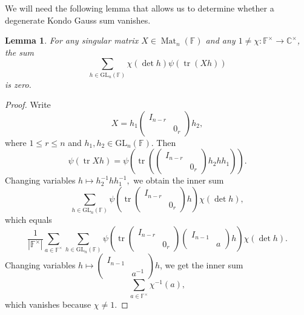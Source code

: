 \documentclass[12pt, reqno]{amsart}
\newtheorem{lemma}[theorem]{Lemma}
\theoremstyle{definition}
\theoremstyle{definition}
\theoremstyle{definition}
\newcommand{\cComplex}{\mathbb{C}}
\newcommand{\multiplicativegroup}[1]{#1^{\times}}
\newcommand{\sizeof}[1]{\left|#1\right|}
\newcommand{\fieldCharacter}{\psi}
\newcommand{\IdentityMatrix}[1]{I_{#1}}
\newcommand{\trace}{\operatorname{tr}}
\newcommand{\GL}{\mathrm{GL}}
\newcommand{\finiteField}{\mathbb{F}}
\newcommand{\squareMatrix}{\operatorname{Mat}}
\begin{document}
We will need the following lemma that allows us to determine whether a degenerate Kondo Gauss sum vanishes.
\begin{lemma}\label{lem:sum-vanishes-for-singular-matrices}
	For any singular matrix $X \in \squareMatrix_n\left(\finiteField\right)$ and any $1 \ne \chi \colon \multiplicativegroup{\finiteField} \to \multiplicativegroup{\cComplex}$, the sum
	$$\sum_{h \in \GL_n\left(\finiteField\right)} \chi\left(\det h\right) \fieldCharacter\left(\trace\left(Xh\right)\right)$$
	is zero.
\end{lemma}
\begin{proof}
	Write $$X = h_1 \begin{pmatrix}
		\IdentityMatrix{n-r}\\
		& 0_r
	\end{pmatrix} h_2,$$
	where $1 \le r \le n$ and $h_1, h_2 \in \GL_n\left(\finiteField\right)$. Then
	$$\fieldCharacter\left(\trace Xh\right) = \fieldCharacter\left(\trace\left( \begin{pmatrix}
		\IdentityMatrix{n-r}\\
		& 0_r
	\end{pmatrix} h_2 h h_1\right)\right).$$
	Changing variables $h \mapsto h_2^{-1} h h_1^{-1},$
	we obtain the inner sum
	$$\sum_{h \in \GL_n\left(\finiteField\right)} \fieldCharacter\left(\trace \begin{pmatrix}
		\IdentityMatrix{n-r}\\
		& 0_r
	\end{pmatrix} h \right) \chi\left(\det h\right),$$
	which equals
	$$\frac{1}{\sizeof{\multiplicativegroup{\finiteField}}} \sum_{a \in \multiplicativegroup{\finiteField}} \sum_{h \in \GL_n\left(\finiteField\right)} \fieldCharacter\left(\trace \begin{pmatrix}
		\IdentityMatrix{n-r}\\
		& 0_r
	\end{pmatrix} \begin{pmatrix}
		\IdentityMatrix{n-1}\\
		& a
	\end{pmatrix} h \right) \chi\left(\det h\right).$$
	Changing variables $h \mapsto \left(\begin{smallmatrix}
		\IdentityMatrix{n-1}\\
		& a^{-1}
	\end{smallmatrix}\right) h$, we get the inner sum $$\sum_{a \in \multiplicativegroup{\finiteField}} \chi^{-1}\left(a\right),$$
	which vanishes because $\chi \ne 1$.
\end{proof}
\end{document}
